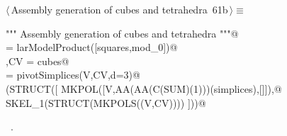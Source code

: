 \documentclass[11pt,oneside]{article}    %
\begin{document}
\begin{flushleft} \small \label{scrap120}
\protect{}$\langle\,$Assembly generation of cubes and tetrahedra\nobreak\ {\footnotesize 61b}$\,\rangle\equiv$
\vspace{-1ex}
\begin{list}{}{} \item
\mbox{}\verb@""" Assembly generation  of cubes and tetrahedra """@\\
\mbox{}\verb@cubes = larModelProduct([squares,mod_0])@\\
\mbox{}\verb@V,CV = cubes@\\
\mbox{}\verb@simplices = pivotSimplices(V,CV,d=3)@\\
\mbox{}\verb@VIEW(STRUCT([ MKPOL([V,AA(AA(C(SUM)(1)))(simplices),[]]),@\\
\mbox{}\verb@              SKEL_1(STRUCT(MKPOLS((V,CV)))) ]))@\\
\mbox{}\verb@@{\NWsep}
\end{list}
\vspace{-1ex}
\footnotesize\addtolength{\baselineskip}{-1ex}
\begin{list}{}{\setlength{\itemsep}{-\parsep}\setlength{\itemindent}{-\leftmargin}}
\item \NWtxtMacroRefIn\ .
\end{list}
\end{flushleft}









\end{document}
